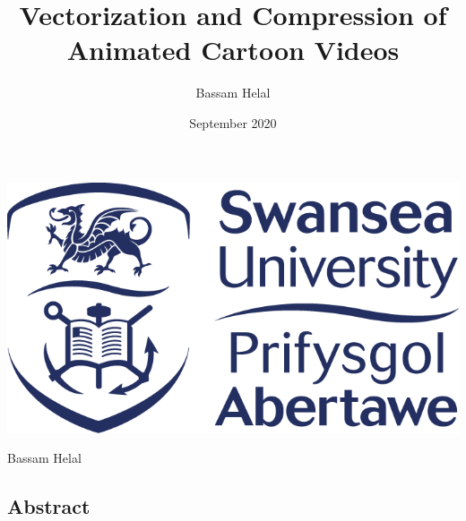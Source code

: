 \documentclass[12pt]{article}
\title{Vectorization and Compression of Animated Cartoon Videos}
\author{Bassam Helal}
\date{September 2020}
\newcommand{\black}{
\pagecolor{black}
\color{white}
}
\begin{document}
    \black


    \maketitle

    \begin{center}
        \vspace{8cm}
        \includegraphics[scale=0.65]{SwanseaUniversityLogo.png}
    \end{center}
    \begin{center}
        \vspace{1cm}
        \large
        Bassam Helal
    \end{center}

    \pagebreak

    \begin{center}
        \section*{Abstract}
    \end{center}


    \pagebreak

    \renewcommand*\contentsname{
    \begin{center}
        Table of Contents
    \end{center}}

    \tableofcontents
\end{document}
